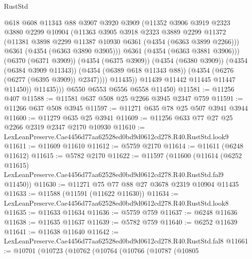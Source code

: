 \begin{lexlean}{RustStd}
\begin{coremodule}
                        @618
                        @608
                        @11343
                        @88
                        @3907
                        @3920
                        @3909
                        (@11352
                          @3906
                          @3919
                          @2323
                          @3880
                          @2299
                          @10904
                          (@11363
                            @3905
                            @3918
                            @2323
                            @3889
                            @2299
                            @11372
                            (@11381 @3898 @2299 @11387 @10930 @6361 (@4354 (@6363 @3899 @2266)))
                            @6361
                            (@4354 (@6363 @3890 @3905)))
                          @6361
                          (@4354 (@6363 @3881 @3906)))
                        (@6370 (@6371 @3909))
                        (@4354 (@6375 @3909))
                        (@4354 (@6380 @3909))
                        (@4354 (@6384 @3909 @11343))
                        (@4354 (@6389 @618 @11343 @88))
                        (@4354 (@6276 (@6277 (@6395 @3909)) @2347))))
                    @11435))
                @11439
                @11442
                @11445
                @11447
                @11450))
            @11435)))
      @6550
      @6553
      @6556
      @6558
      @11450)
@11581 := @11256 @407
@11588 := @11581 @637 @508 @25 @2266 @3945 @2347 @759
@11591 := @11266 @637 @508 @3945
@11597 := @11271 @635 @78 @25 @507 @3941 @3944
@11600 := @11279 @635 @25 @3941
@11609 := @11256 @633 @77 @27 @25 @2266 @2319 @2347 @2170 @10930
@11610 := LexLeanPreserve.Cae4456d77aa62528ed0bd9d0612cd278.R40.RustStd.look9
@11611 := @11609 @11610
@11612 := @5759 @2170
@11614 := @11611 (@6248 @11612)
@11615 := @5782 @2170
@11622 := @11597
    (@11600
      (@11614
        (@6252 @11615)
        LexLeanPreserve.Cae4456d77aa62528ed0bd9d0612cd278.R40.RustStd.fal9
        @11450))
@11630 := @11271 @75 @77 @88 @27 @3678 @2319 @10904 @11435
@11633 := @11588 (@11591 (@11622 @11630))
@11634 := LexLeanPreserve.Cae4456d77aa62528ed0bd9d0612cd278.R40.RustStd.look8
@11635 := @11633 @11634
@11636 := @5759 @759
@11637 := @6248 @11636
@11638 := @11635 @11637
@11639 := @5782 @759
@11640 := @6252 @11639
@11641 := @11638 @11640
@11642 := LexLeanPreserve.Cae4456d77aa62528ed0bd9d0612cd278.R40.RustStd.fal8
@11661 := @10701
    (@10723
      (@10762
        (@10764
          (@10766
            (@10787
              (@10805

\end{coremodule}
\end{lexlean}
